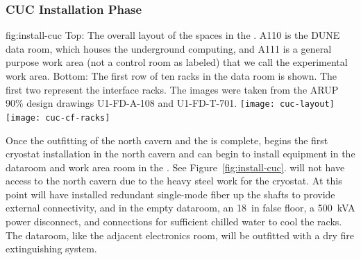 \subsubsection{CUC Installation Phase}
\label{sec:fdsp-tc-inst-CUC}

\begin{dunefigure}{fig:install-cuc}
  {Top: The overall layout of the  spaces in the . A110 is the DUNE data room, which houses the underground computing, and A111 is a general purpose work area (not a control room as labeled) that we call the experimental work area. Bottom: The first row of ten racks in the data room is shown. The first two represent the  interface racks. The images were taken from the ARUP 90\% design drawings U1-FD-A-108 and U1-FD-T-701.}
\texttt{[image: cuc-layout]}
\vspace{-2pt}
\texttt{[image: cuc-cf-racks]}
\end{dunefigure}

Once the   outfitting of the north cavern and the  is complete,   begins the first cryostat installation in the north cavern and  can begin to install equipment in the dataroom and work area room in the . See Figure~\ref{fig:install-cuc}.   will not have access to the north cavern due to the heavy steel work for the cryostat. 
At this point    will have installed redundant single-mode fiber up the shafts to provide external connectivity, and in the empty dataroom,  an \SI{18}{in} false floor, a \SI{500}{kVA} power disconnect, and connections for sufficient chilled water to cool the racks. The dataroom, like the adjacent  electronics room, will be outfitted with a dry fire extinguishing system. 
 

